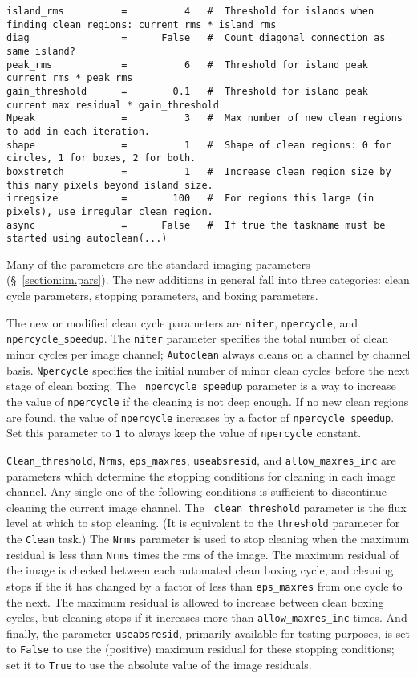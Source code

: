 \begin{verbatim}
island_rms          =          4   #  Threshold for islands when finding clean regions: current rms * island_rms
diag                =      False   #  Count diagonal connection as same island?
peak_rms            =          6   #  Threshold for island peak current rms * peak_rms
gain_threshold      =        0.1   #  Threshold for island peak current max residual * gain_threshold
Npeak               =          3   #  Max number of new clean regions to add in each iteration.
shape               =          1   #  Shape of clean regions: 0 for circles, 1 for boxes, 2 for both.
boxstretch          =          1   #  Increase clean region size by this many pixels beyond island size.
irregsize           =        100   #  For regions this large (in pixels), use irregular clean region.
async               =      False   #  If true the taskname must be started using autoclean(...)
\end{verbatim}
\normalsize 
Many of the parameters are the standard imaging parameters
(\S~\ref{section:im.pars}).  
The new additions in general fall into three categories: clean cycle
parameters, stopping parameters, and boxing parameters.

The new or modified clean cycle parameters are {\tt niter}, {\tt npercycle},
and {\tt npercycle\_speedup}.  The {\tt niter} parameter specifies the total
number of clean minor cycles per image channel; {\tt Autoclean} always cleans
on a channel by channel basis.  {\tt Npercycle} specifies the initial number of
minor clean cycles before the next stage of clean boxing.  The {\tt
npercycle\_speedup} parameter is a way to increase the value of {\tt npercycle}
if the cleaning is not deep enough.  If no new clean regions are found, the
value of {\tt npercycle} increases by a factor of {\tt npercycle\_speedup}.  Set
this parameter to {\tt 1} to always keep the value of {\tt npercycle} constant.

{\tt Clean\_threshold}, {\tt Nrms}, {\tt eps\_maxres}, {\tt useabsresid}, and
{\tt allow\_maxres\_inc} are parameters which determine the stopping conditions
for cleaning in each image channel.  Any single one of the following conditions
is sufficient to discontinue cleaning the current image channel.  The {\tt
clean\_threshold} parameter is the flux level at which to stop cleaning.  (It is
equivalent to the {\tt threshold} parameter for the {\tt Clean} task.)  The
{\tt Nrms} parameter is used to stop cleaning when the maximum residual is less
than {\tt Nrms} times the rms of the image.  The maximum residual of the image
is checked between each automated clean boxing cycle, and cleaning stops if the
it has changed by a factor of less than {\tt eps\_maxres} from one cycle to the
next.  The maximum residual is allowed to increase between clean boxing cycles,
but cleaning stops if it increases more than {\tt allow\_maxres\_inc} times.
And finally, the parameter {\tt useabsresid}, primarily available for testing
purposes, is set to {\tt False} to use the (positive) maximum residual
for these stopping conditions; set it to {\tt True} to use the absolute value
of the image residuals.

